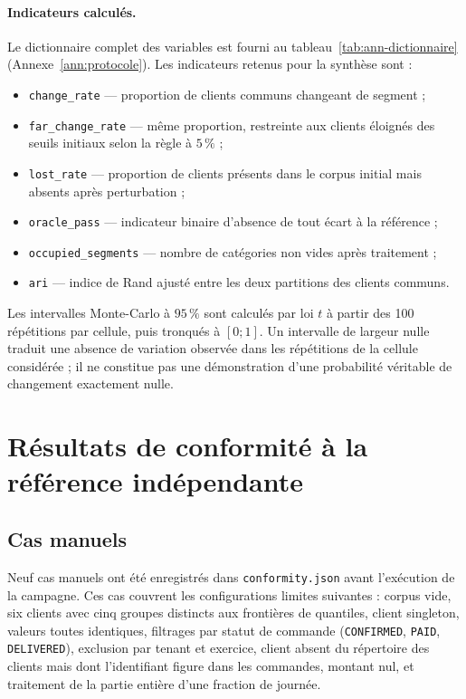 \paragraph{Indicateurs calculés.}
Le dictionnaire complet des variables est fourni au tableau~\ref{tab:ann-dictionnaire}
(Annexe~\ref{ann:protocole}). Les indicateurs retenus pour la synthèse sont :

\begin{itemize}
  \item \texttt{change\_rate} — proportion de clients communs changeant de segment ;
  \item \texttt{far\_change\_rate} — même proportion, restreinte aux clients éloignés des
    seuils initiaux selon la règle à $5\,\%$ ;
  \item \texttt{lost\_rate} — proportion de clients présents dans le corpus initial mais
    absents après perturbation ;
  \item \texttt{oracle\_pass} — indicateur binaire d'absence de tout écart à la référence ;
  \item \texttt{occupied\_segments} — nombre de catégories non vides après traitement ;
  \item \texttt{ari} — indice de Rand ajusté entre les deux partitions des clients communs.
\end{itemize}

Les intervalles Monte-Carlo à $95\,\%$ sont calculés par loi $t$ à partir des 100 répétitions
par cellule, puis tronqués à $[0;1]$. Un intervalle de largeur nulle traduit une absence de
variation observée dans les répétitions de la cellule considérée ; il ne constitue pas une
démonstration d'une probabilité véritable de changement exactement nulle.

\section{Résultats de conformité à la référence indépendante}
\label{sec:resultats-conformite}

\subsection{Cas manuels}
\label{subsec:resultats-cas-manuels}

Neuf cas manuels ont été enregistrés dans \texttt{conformity.json} avant l'exécution de
la campagne. Ces cas couvrent les configurations limites suivantes : corpus vide, six clients
avec cinq groupes distincts aux frontières de quantiles, client singleton, valeurs toutes
identiques, filtrages par statut de commande (\texttt{CONFIRMED}, \texttt{PAID},
\texttt{DELIVERED}), exclusion par tenant et exercice, client absent du répertoire des
clients mais dont l'identifiant figure dans les commandes, montant nul, et traitement de la
partie entière d'une fraction de journée.

